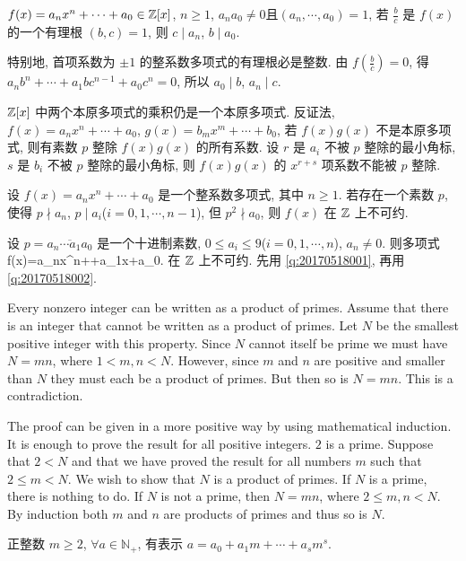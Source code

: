 $f(x)=a_nx^n+\cdots+a_0\in\mathbb{Z}[x]$, $n\ge1$, $a_na_0\ne0$且$(a_n,\cdots, a_0)=1$, 若 $\frac{b}{c}$ 是 $f(x)$ 的一个有理根 $(b,c)=1$, 
则 $c\mid a_n$, $b\mid a_0$.

特别地, 首项系数为 $\pm 1$ 的整系数多项式的有理根必是整数.
\et
\ba
由 $f\left(\frac{b}{c}\right)=0$, 得 $a_nb^n+\cdots+a_1bc^{n-1}+a_0c^n=0$, 所以 $a_0\mid b$, $a_n\mid c$.

{\color{red}{一种证明有理数是整数的证明途径: 证复数是整数, 先证其是有理数, 且找到作为零点的首一多项式.}}
\ea

$\mathbb{Z}[x]$ 中两个本原多项式的乘积仍是一个本原多项式.
\et
\ba
反证法, $f(x)=a_nx^n+\cdots+a_0$, $g(x)=b_mx^m+\cdots+b_0$, 若 $f(x)g(x)$ 不是本原多项式, 则有素数 $p$ 整除 $f(x)g(x)$ 的所有系数.
设 $r$ 是 $a_i$ 不被 $p$ 整除的最小角标, $s$ 是 $b_i$ 不被 $p$ 整除的最小角标, 则 $f(x)g(x)$ 的 $x^{r+s}$ 项系数不能被 $p$ 整除.
\ea

设 $f(x)=a_nx^n+\cdots+a_0$ 是一个整系数多项式, 其中 $n\ge1$. 若存在一个素数 $p$, 使得 $p\nmid a_n$, $p\mid a_i$($i=0,1,\cdots,n-1$), 
但 $p^2\nmid a_0$, 则 $f(x)$ 在 $\mathbb{Z}$ 上不可约.
\et

设 $p=\overline{a_n\cdots a_1a_0}$ 是一个十进制素数, $0\le a_i\le9$($i=0,1,\cdots, n$), $a_n\ne0$. 则多项式
\bee
f(x)=a_nx^n+\cdots+a_1x+a_0.
\eee
在 $\mathbb{Z}$ 上不可约.
\et
\ba
先用 \ref{q:20170518001}, 再用 \ref{q:20170518002}.
\ea

\bt{}{}
Every nonzero integer can be written as a product of primes.
\et
\ba
Assume that there is an integer that cannot be written as a product of primes.
Let $N$ be the smallest positive integer with this property. Since $N$ cannot itself be prime we must have
$N=mn$, where $1<m, n<N$. However, since $m$ and $n$ are positive and smaller than $N$ they must each be a product
of primes. But then so is $N=mn$. This is a contradiction.

The proof can be given in a more positive way by using mathematical induction.
It is enough to prove the result for all positive integers. $2$ is a prime.
Suppose that $2<N$ and that we have proved the result for all numbers $m$ such that $2\le m<N$. 
We wish to show that $N$ is a product of primes. 
If $N$ is a prime, there is nothing to do. 
If $N$ is not a prime, then $N=mn$, where $2\le m, n<N$. 
By induction both $m$ and $n$ are products of primes and thus so is $N$.
\ea

正整数 $m\ge2$, $\forall a\in\mathbb{N}_{+}$, 有表示 $a=a_0+a_1m+\cdots+a_sm^s$.
\et

